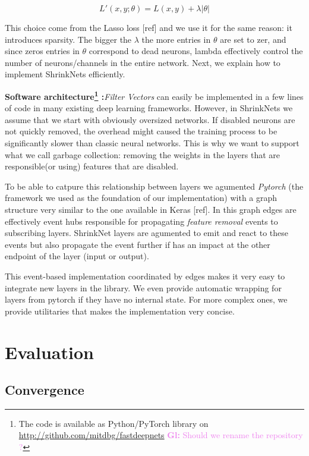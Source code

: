 \documentclass[sigconf]{acmart}
\newcommand{\gl}[1]{\textcolor{violet}{{\bf Gl:} #1}}
\begin{document}
\begin{equation}
  L'(x,y;\theta) = L(x, y) + \lambda|\theta|
\end{equation}

This choice come from the Lasso loss [ref] and we use it for the same reason:
it introduces sparsity. The bigger the $\lambda$ the more entries in $\theta$
are set to zer, and since zeros entries in $\theta$ correspond to dead neurons,
lambda effectively control the number of neurons/channels in the entire
network.
Next, we explain how to implement ShrinkNets efficiently.

\textbf{Software architecture\footnote{The code is available as Python/PyTorch library on \url{http://github.com/mitdbg/fastdeepnets} \gl{Should we rename the repository ?}} :}\textit{Filter Vectors} can easily be implemented in a few lines of code
in many existing deep learning frameworks. However, in ShrinkNets we assume
that we start with obviously oversized networks. If disabled neurons are not
quickly removed, the overhead might caused the training process to be
significantly slower than classic neural networks. This is why we want to
support what we call garbage collection: removing the weights in the layers
that are responsible(or using) features that are disabled.
\par To be able to catpure this relationship between layers we agumented
\textit{Pytorch} (the framework we used as the foundation of our implementation)
with a graph structure very similar to the one available in Keras [ref].
In this graph edges are effectively event hubs responsible for propagating
\textit{feature removal} events to subscribing layers. ShrinkNet layers are
agumented to emit and react to these events but also propagate the event
further if has an impact at the other endpoint of the layer (input or output).
\par This event-based implementation coordinated by edges makes it very easy
to integrate new layers in the library. We even provide automatic wrapping
for layers from pytorch if they have no internal state. For more complex ones,
we provide utilitaries that makes the implementation very concise.

\section{Evaluation}
\subsection{Convergence}
\end{document}
